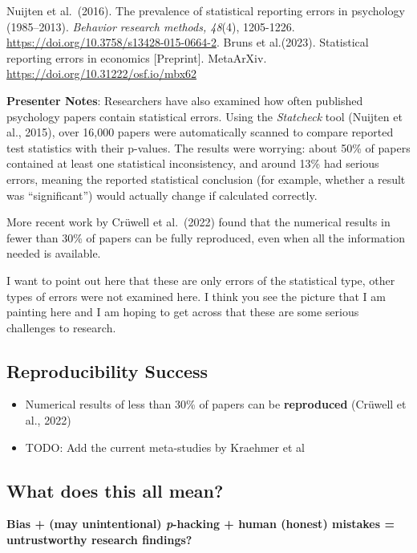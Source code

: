 \documentclass[
  letterpaper,
  DIV=11,
  numbers=noendperiod]{scrartcl}
\providecommand{\tightlist}{%
  \setlength{\itemsep}{0pt}\setlength{\parskip}{0pt}}
\begin{document}
Nuijten et al.~(2016). The prevalence of statistical reporting errors in
psychology (1985--2013). \emph{Behavior research methods, 48}(4),
1205-1226. \url{https://doi.org/10.3758/s13428-015-0664-2}. Bruns et
al.(2023). Statistical reporting errors in economics {[}Preprint{]}.
MetaArXiv. \url{https://doi.org/10.31222/osf.io/mbx62}

\textbf{Presenter Notes}: Researchers have also examined how often
published psychology papers contain statistical errors. Using the
\emph{Statcheck} tool (Nuijten et al., 2015), over 16,000 papers were
automatically scanned to compare reported test statistics with their
p-values. The results were worrying: about 50\% of papers contained at
least one statistical inconsistency, and around 13\% had serious errors,
meaning the reported statistical conclusion (for example, whether a
result was ``significant'') would actually change if calculated
correctly.

More recent work by Crüwell et al.~(2022) found that the numerical
results in fewer than 30\% of papers can be fully reproduced, even when
all the information needed is available.

I want to point out here that these are only errors of the statistical
type, other types of errors were not examined here. I think you see the
picture that I am painting here and I am hoping to get across that these
are some serious challenges to research.

\subsection{Reproducibility Success}\label{reproducibility-success}

\begin{itemize}
\tightlist
\item
  Numerical results of less than 30\% of papers can be
  \textbf{reproduced} (Crüwell et al., 2022)
\item
  TODO: Add the current meta-studies by Kraehmer et al
\end{itemize}

\subsection{What does this all mean?}\label{what-does-this-all-mean}

\textbf{Bias + (may unintentional) \emph{p}-hacking + human (honest)
mistakes = untrustworthy research findings?}
\end{document}
